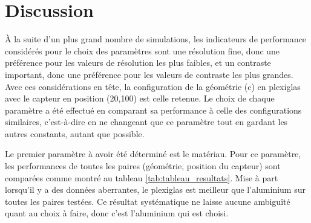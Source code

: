 \documentclass[conference]{IEEEtran}
\begin{document}


\section{Discussion}

À la suite d'un plus grand nombre de simulations, les indicateurs de performance 
considérés pour le choix des paramètres sont une résolution fine, donc une 
préférence pour les valeurs de résolution les plus faibles, et un contraste 
important, donc une préférence pour les valeurs de contraste les plus grandes.
Avec ces considérations en tête, la configuration de la géométrie (c) en plexiglas 
avec le capteur en position (20,100) est celle retenue. Le choix de chaque paramètre
a été effectué en comparant sa performance à celle des configurations similaires, 
c'est-à-dire en ne changeant que ce paramètre tout en gardant les autres constants,
autant que possible.

Le premier paramètre à avoir été déterminé est le matériau. Pour ce paramètre, 
les performances de toutes les paires (géométrie, position du capteur) sont 
comparées comme montré au tableau \ref{tab:tableau_resultats}. Mise à part lorsqu'il y a des données aberrantes, le plexiglas est 
meilleur que l'aluminium sur toutes les paires testées. Ce résultat systématique 
ne laisse aucune ambiguîté quant au choix à faire, donc c'est l'aluminium qui est 
choisi.
\end{document}
